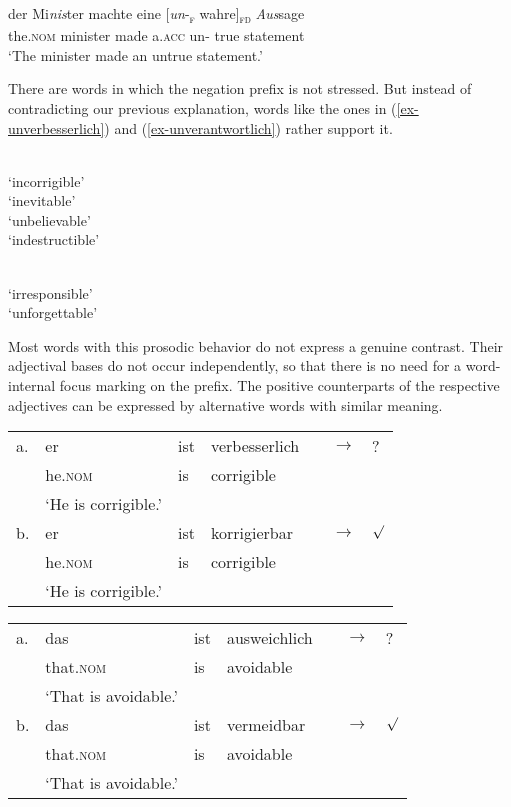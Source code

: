\documentclass[output=paper
  ,nobabel
  ,draftmode
  ,colorlinks, citecolor=brown
]{langscibook}
\begin{document}
\ea\label{ex-untrue}
\gll der              Mi\emph{nis}ter machte eine           {}[\emph{un}-\textsubscript{\textsc{f}} wahre]\textsubscript{\textsc{fd}} \emph{Aus}sage\\ 
     the.\textsc{nom} minister made   a.\textsc{acc} \spacebr{}un-           true                       statement\\
\glt `The minister made an untrue statement.'
\z

\noindent There are words in which the negation prefix is not stressed. But instead of contradicting our previous explanation, words like the ones in (\ref{ex-unverbesserlich}) and (\ref{ex-unverantwortlich}) rather support it.

\eal\label{ex-unverbesserlich}
\ex{}\\`incorrigible'
\ex{}\\`inevitable'
\ex{}\\`unbelievable'
\ex{}\\`indestructible'
\zl

\eal\label{ex-unverantwortlich}
\ex{}\\`irresponsible'
\ex{}\\`unforgettable'
\zl

\noindent Most words with this prosodic behavior do not express a genuine contrast. Their adjectival bases do not occur independently, so that there is no need for a word-internal focus marking on the prefix. The positive counterparts of the respective adjectives can be expressed by alternative words with similar meaning.

\ea
\begin{tabular}[t]{lllllll}
	a.&er&ist&verbesserlich&&$\rightarrow$&?\\
	&he.\textsc{nom}&is&corrigible&&&\\
	&`He is corrigible.'&&&&&\\
	b.&er&ist&korrigierbar&&$\rightarrow$&$\surd$\\
	  &he.\textsc{nom}&is&corrigible&&&\\
          &`He is corrigible.'
\end{tabular}
\z
\ea
\begin{tabular}[t]{lllllll}
	a.&das&ist&ausweichlich&&$\rightarrow$&?\\
	&that.\textsc{nom}&is&avoidable&&&\\
	& `That is avoidable.'&&&&&\\
	b.&das&ist&vermeidbar&&$\rightarrow$&$\surd$\\
	  &that.\textsc{nom}&is&avoidable&&&\\
          & `That is avoidable.'
\end{tabular}
\z
\end{document}
